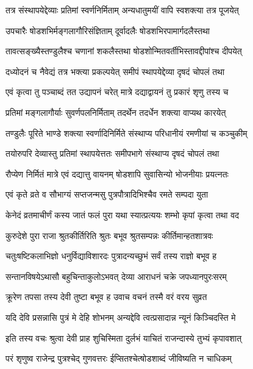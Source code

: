 \twolineshloka
{तत्र संस्थापयेद्देव्याः प्रतिमां स्वर्णनिर्मिताम्}
{अन्यधातुमयीं वापि स्वशक्त्या तत्र पूजयेत्} %

\twolineshloka
{उपचारैः षोडशभिर्मङ्गलागौरिसंज्ञिताम्}
{दूर्वादलैः षोडशभिरपामार्गदलैस्तथा} %

\twolineshloka
{तावत्सङ्ख्यैस्तण्डुलैश्च चणानां शकलैस्तथा}
{षोडशोन्मितवर्तीभिस्तावद्दीपांश्च दीपयेत्} %

\twolineshloka
{दध्योदनं च नैवेद्यं तत्र भक्त्या प्रकल्पयेत्}
{समीपं स्थापयेद्देव्या दृषदं चोपलं तथा} %

\twolineshloka
{एवं कृत्वा तु पञ्चाब्दं तत उद्यापनं चरेत्}
{मात्रे दद्याद्वायनं तु प्रकारं शृणु तस्य च} %

\twolineshloka
{प्रतिमां मङ्गलागौर्याः सुवर्णपलनिर्मिताम्}
{तदर्थेन तदर्धेन शक्त्या वाप्यथ कारयेत्} %

\twolineshloka
{तण्डुलैः पूरिते भाण्डे शक्त्या स्वर्णादिनिर्मिते}
{संस्थाप्य परिधानीयं रमणीयां च कञ्चुकीम्} %

\twolineshloka
{तयोरुपरि देव्यास्तु प्रतिमां स्थापयेत्ततः}
{समीपभागे संस्थाप्य दृषदं चोपलं तथा} %

\twolineshloka
{रौप्येण निर्मितं मात्रे एवं दद्यात्तु वायनम्}
{षोडशापि सुवासिन्यो भोजनीयाः प्रयत्नतः} %

\twolineshloka
{एवं कृते व्रते व सौभाग्यं सप्तजन्मसु}
{पुत्रपौत्रादिभिश्चैव रमते सम्पदा युता} %


\twolineshloka
{केनेदं व्रतमाचीर्णं कस्य जातं फलं पुरा}
{यथा स्यात्प्रत्ययः शम्भो कृपां कृत्वा तथा वद} %


\twolineshloka
{कुरुदेशे पुरा राजा श्रुतकीर्तिरिति श्रुतः}
{बभूव श्रुतसम्पन्नः कीर्तिमान्हतशात्रवः} %

\twolineshloka
{चतुःषष्टिकलाभिज्ञो धनुर्विद्याविशारदः}
{पुत्रादन्यच्छुभं सर्वं तस्य राज्ञो बभूव ह} %

\twolineshloka
{सन्तानविषयेऽथासौ बहुचिन्ताकुलोऽभवत्}
{देव्या आराधनं चक्रे जपध्यानपुरःसरम्} %

\twolineshloka
{क्रूरेण तपसा तस्य देवी तुष्टा बभूव ह}
{उवाच वचनं तस्मै वरं वरय सुव्रत} %


\twolineshloka
{यदि देवि प्रसन्नासि पुत्रं मे देहि शोभनम्}
{अन्यद्देवि त्वत्प्रसादान्न न्यूनं किञ्चिदस्ति मे} %

\twolineshloka
{इति तस्य वचः श्रुत्वा देवी प्राह शुचिस्मिता}
{दुर्लभं याचितं राजन्दास्ये तुभ्यं कृपावशात्} %

\twolineshloka
{परं शृणुष्व राजेन्द्र पुत्रश्चेद् गुणवत्तरः}
{ईप्सितश्चेत्षोडशाब्दं जीविष्यति न चाधिकम्} %

